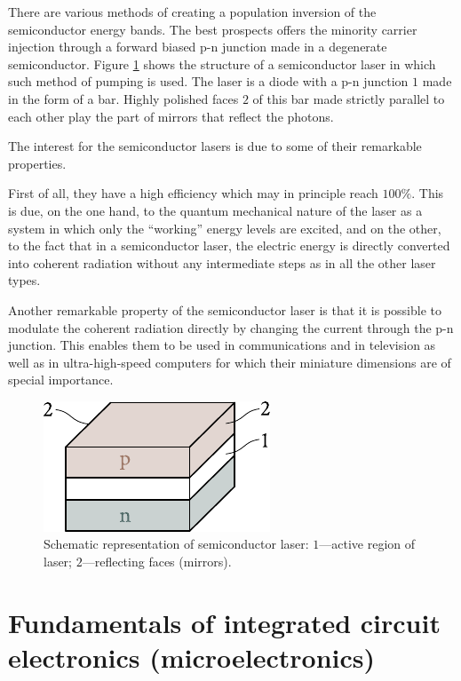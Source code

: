 There are various methods of creating a population inversion of the semiconductor energy bands. The best prospects offers the minority carrier injection through a forward biased p-n junction made in a degenerate semiconductor. Figure \ref{fig:8_26} shows the structure of a semiconductor laser in which such method of pumping is used. The laser is a diode with a p-n junction $1$ made in the form of a bar. Highly polished faces $2$ of this bar made strictly parallel to each other play the part of mirrors that reflect the photons.

The interest for the semiconductor lasers is due to some of their remarkable properties.

First of all, they have a high efficiency which may in principle reach $100\%$. This is due, on the one hand, to the quantum mechanical nature of the laser as a system in which only the ``working'' energy levels are excited, and on the other, to the fact that in a semiconductor laser, the electric energy is directly converted into coherent radiation without any intermediate steps as in all the other laser types.

Another remarkable property of the semiconductor laser is that it is possible to modulate the coherent radiation directly by changing the current through the p-n junction. This enables them to be used in communications and in television as well as in ultra-high-speed computers for which their miniature dimensions are of special importance.

\begin{figure}[t]
	\begin{center}
		\includegraphics[scale=1.1]{figures/ch_08/fig_8_26.pdf}
		\caption[]{Schematic representation of semiconductor laser: $1$---active region of laser; $2$---reflecting faces (mirrors).}
		\label{fig:8_26}
	\end{center}
	\vspace{-0.8cm}
\end{figure}

\section{Fundamentals of integrated circuit electronics (microelectronics)}\label{sec:78}

